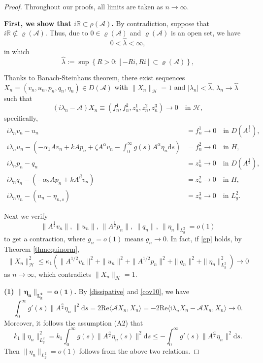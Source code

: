 \documentclass[12pt,reqno]{article}
\begin{document}
	\begin{proof}
		Throughout our proofs, all limits are taken as $n\to\infty$.
		
\noindent \textbf{First, we show that ${i\mathbb{R} \subset \rho(\mathcal{A})}$.} By contradiction, suppose that $i\mathbb{R} \not\subset \varrho(\mathcal{A})$. Thus, due to $0 \in \varrho(\mathcal{A})$ and $\varrho(\mathcal{A})$ is an open set, we have
		\[
		0 < \hat{\lambda} < \infty,
		\]
		in which
		\[
		\hat{\lambda} := \sup\left\{ R > 0 : [-Ri, Ri] \subset \varrho(\mathcal{A}) \right\},
		\]
		
		Thanks to Banach-Steinhaus theorem, there exist sequences $X_n = (v_n, u_n, p_n, q_n, \eta_n) \in {D}(\mathcal{A})$ with $\|X_n\|_{\mathcal{H}} = 1$
		and $|\lambda_n| < \hat{\lambda}$, $\lambda_n \to \hat{\lambda}$ such that
		\begin{equation}\label{cov10}
			(i\lambda_n - \mathcal{A})X_n \equiv (f_n^1, f_n^2, z_n^1, z_n^2, z_n^3) \to 0 \quad \text{in } \mathcal{H},
		\end{equation}
		specifically,
		\begin{align}
			i\lambda_n v_n - u_n &= f_n^{1}\to0 \quad \text{in } {D}({A}^{\frac{1}{2}}), \label{gp1}\\
			i\lambda_n u_n - \left(-\alpha_1 A v_n + k A p_n + \zeta A^\alpha v_n - \int_0^\infty g(s) A^\alpha \eta_n\mathrm{d}s\right) &= f_n^{2}\to0 \quad \text{in } {H}, \label{gp2}\\
			i\lambda_n p_n - q_n &= z_n^{ 1}\to0 \quad \text{in } {D}({A}^{\frac{1}{2}}), \label{gp3}\\
			i\lambda_n q_n - \left(-\alpha_2 A p_n + k A^\beta v_n\right) &= z_n^{2}\to0 \quad \text{in } {H}, \label{gp4}\\
			i\lambda_n \eta_n - (u_n - \eta_{n,s}) &= z_n^{3}\to0 \quad \text{in } L_g^2.\label{gp5}
		\end{align}
		
		Next we verify
		\begin{equation}\label{gp}
			\|{A}^{\frac12}v_n\|,\ \|u_n\|,\ \|{A}^{\frac12}p_n\|,\ \|q_n\|,\ \|\eta_n\|_{L_g^2} = o(1)
		\end{equation}
		to get a contraction, where $g_n=o(1)$ means $g_n\to0$. In fact, if \eqref{gp} holds, by Theorem \ref{thmequinorm}, $$\|X_n\|_{\mathcal{H}}^2\le\kappa_1\left(\|A^{1/2}v_n\|^2+\|u_n\|^2+\|A^{1/2}p_n\|^2+\|q_n\|^2+\|\eta_n\|_{L^2_g}^2\right)\to0$$
		as $n\to\infty$, which contradicts $\|X_n\|_{\mathcal{H}}=1$.
		
	{\bf \noindent(1) $\bm{\|\eta_n\|_{L_g^2} =o(1)}$.}
		By \eqref{dissipative} and \eqref{cov10}, we have
		\[
		\int_0^\infty g'(s)\|A^{\frac{\alpha}{2}}\eta_n\|^2 \mathrm{d}s
		= 2\mathrm{Re}\langle \mathcal{A}X_n,X_n \rangle
		= -2\mathrm{Re}\langle \mathrm{i}\lambda_n X_n - \mathcal{A}X_n,X_n \rangle \to 0.
		\]
		Moreover, it follows the assumption (A2) that
		\[k_1\|\eta_n\|_{L^2_g}^2=k_1\int_0^\infty g(s)\|A^{\frac{\alpha}{2}}\eta_n(s)\|^2 \mathrm{d}s\le-\int_0^\infty g'(s)\|A^{\frac{\alpha}{2}}\eta_n\|^2 \mathrm{d}s.\]
		Then $\|\eta_n\|_{L_g^2} =o(1)$ follows from the above two relations.
		

\end{proof}
\end{document}
